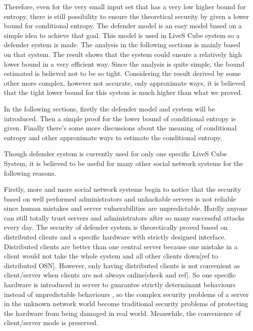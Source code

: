 \documentclass[10pt,a4paper]{article}
\begin{document}
	Therefore, even for the very small input set that has a very low
	higher bound for entropy, there is still possibility to ensure the
	theoretical security by given a lower bound for conditional entropy.
	The defender model is an easy model based on a simple idea to achieve that goal.
	This model is used in LiveS Cube system so a defender system is made.
	The analysis in the following sections is mainly based on that system.
	The result shows that the system could ensure a relatively high lower bound
	in a very efficient way. Since the analysis is quite simple, the
	bound estimated is believed not to be so tight. 
	Considering the result derived by some other
	more complex, however not accurate, only approximate ways, it is believed
	that the tight lower bound for this system is much higher than what we proved.
	
	In the following sections, firstly the defender model and system will be
	introduced. Then a simple proof for the lower bound of conditional entropy
	is given. Finally there's some more discussions about the meaning of
	conditional entropy and other approximate ways to estimate the conditional
	entropy.
	
	Though defender system is currently used for only one specific LiveS Cube System,
	it is believed to be useful for many other social network
	systems for the following reasons. 
	
	Firstly, more and more social network systems
	begin to notice that the security based on well performed administrators and
	unhackable servers is not reliable since human mistakes and 
	server vulnerabilities are unpredictable. Hardly anyone can still totally 
	trust servers and administrators after so many successful attacks every day.
	The security of defender system is theoretically proved based on distributed
	clients and a specific hardware with strictly designed interface. Distributed 
	clients are better than one central server because one mistake in a client would not
	take the whole system and all other clients down[ref to distributed OSN]. 
	However, only having distributed clients is not convenient as client/server
	when clients are not always online[check and ref]. So
	one specific hardware is introduced in server to
	guarantee strictly determinant behaviours instead of unpredictable behaviours
	, so the complex security problems of a server in the unknown network world
	become traditional security problems of protecting the hardware from being damaged in real world. Meanwhile,
	the convenience of client/server mode is preserved.
	
\end{document}
